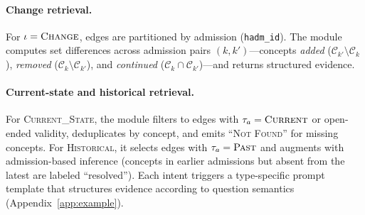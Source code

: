 \paragraph{Change retrieval.}
For $\iota = \textsc{Change}$, edges are partitioned by admission (\texttt{hadm\_id}).
The module computes set differences across admission pairs $(k, k')$---concepts \emph{added} ($\mathcal{C}_{k'} \!\setminus\! \mathcal{C}_k$), \emph{removed} ($\mathcal{C}_k \!\setminus\! \mathcal{C}_{k'}$), and \emph{continued} ($\mathcal{C}_k \!\cap\! \mathcal{C}_{k'}$)---and returns structured evidence.

\paragraph{Current-state and historical retrieval.}
For \textsc{Current\_State}, the module filters to edges with $\tau_a = \textsc{Current}$ or open-ended validity, deduplicates by concept, and emits ``\textsc{Not Found}'' for missing concepts.
For \textsc{Historical}, it selects edges with $\tau_a = \textsc{Past}$ and augments with admission-based inference (concepts in earlier admissions but absent from the latest are labeled ``resolved'').
Each intent triggers a type-specific prompt template that structures evidence according to question semantics (Appendix~\ref{app:example}).
